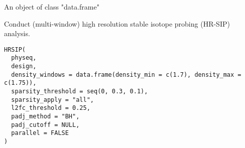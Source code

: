 \documentclass[a4paper]{book}
\begin{document}
%
\begin{Format}
An object of class "data.frame"
\end{Format}
%
\begin{Description}\relax
Conduct (multi-window) high resolution stable isotope probing (HR-SIP) analysis.
\end{Description}
%
\begin{Usage}
\begin{verbatim}
HRSIP(
  physeq,
  design,
  density_windows = data.frame(density_min = c(1.7), density_max = c(1.75)),
  sparsity_threshold = seq(0, 0.3, 0.1),
  sparsity_apply = "all",
  l2fc_threshold = 0.25,
  padj_method = "BH",
  padj_cutoff = NULL,
  parallel = FALSE
)
\end{verbatim}
\end{Usage}
%
\end{document}

